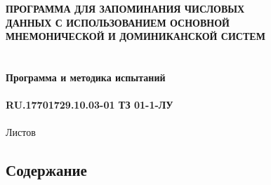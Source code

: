 \documentclass[draft]{article}
\begin{document}
\bigskip
\begin{center}
\topskip=0pt
\vspace*{\fill}
\textbf{ПРОГРАММА ДЛЯ ЗАПОМИНАНИЯ ЧИСЛОВЫХ\\
 ДАННЫХ С ИСПОЛЬЗОВАНИЕМ ОСНОВНОЙ\\
 МНЕМОНИЧЕСКОЙ И ДОМИНИКАНСКОЙ СИСТЕМ\\
~\\
~\\
Программа и методика испытаний\\
~\\
RU.17701729.10.03-01 ТЗ 01-1-ЛУ}\\
~\\
Листов \ztotpages\\
\vspace*{\fill}
\end{center}
\begin{center}
\vspace*{\fill}{
  Москва 2022}
\end{center}
\newpage
\begin{center}
\section {Содержание}
\tableofcontents
\end{center}
\newpage
\end{document}
